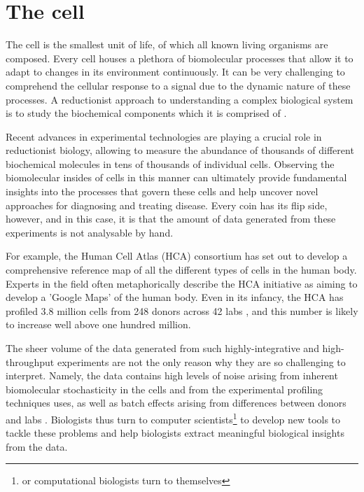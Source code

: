 \section{The cell}
The cell is the smallest unit of life, of which all known living organisms are composed. Every cell houses a plethora of biomolecular processes that allow it to adapt to changes in its environment continuously. It can be very challenging to comprehend the cellular response to a signal due to the dynamic nature of these processes. A reductionist approach to understanding a complex biological system is to study the biochemical components which it is comprised of \cite{brigandt_reductionismbiology_2017}.

Recent advances in experimental technologies are playing a crucial role in reductionist biology, allowing to measure the abundance of thousands of different biochemical molecules in tens of thousands of individual cells. Observing the biomolecular insides of cells in this manner can ultimately provide fundamental insights into the processes that govern these cells and help uncover novel approaches for diagnosing and treating disease. Every coin has its flip side, however, and in this case, it is that the amount of data generated from these experiments is not analysable by hand.  

For example, the Human Cell Atlas (HCA) consortium \cite{regev_humancellatlas_2018} has set out to develop a comprehensive reference map of all the different types of cells in the human body. Experts in the field often metaphorically describe the HCA initiative as aiming to develop a 'Google Maps' of the human body. Even in its infancy, the HCA has profiled 3.8 million cells from 248 donors across 42 labs \cite{humancellatlasconsortium_humancellatlas_2018}, and this number is likely to increase well above one hundred million.


The sheer volume of the data generated from such highly-integrative and high-throughput experiments are not the only reason why they are so challenging to interpret. 
Namely, the data contains high levels of noise arising from inherent biomolecular stochasticity in the cells and from the experimental profiling techniques uses, as well as batch effects arising from differences between donors and labs \cite{hon_humancellatlas_2018}. Biologists thus turn to computer scientists\footnote{or computational biologists turn to themselves} to develop new tools to tackle these problems and help biologists extract meaningful biological insights from the data.

